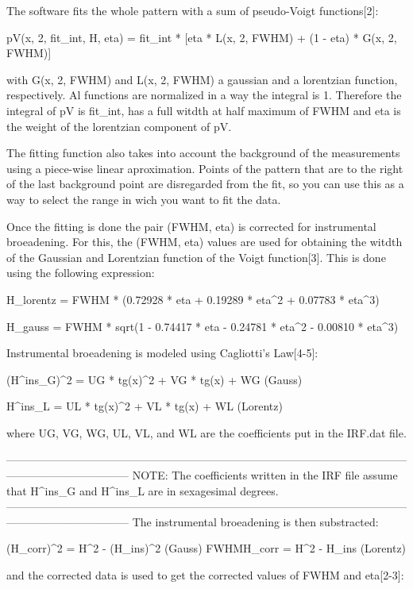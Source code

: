 The software fits the whole pattern with a sum of pseudo-Voigt functions[2]:

    pV(x, 2\theta, fit_int, H, eta) = fit_int * [eta * L(x, 2\theta, FWHM) + (1 - eta) * G(x, 2\theta, FWHM)]

with G(x, 2\theta, FWHM) and L(x, 2\theta, FWHM) a gaussian and a lorentzian function, respectively. Al functions are normalized in a way the integral is 1. 
Therefore the integral of pV is fit_int, has a full witdth at half maximum of FWHM and eta is the weight of the lorentzian component of pV.

The fitting function also takes into account the background of the measurements using a piece-wise linear aproximation. Points of the pattern that are to the
right of the last background point are disregarded from the fit, so you can use this as a way to select the range in wich you want to fit the data.

Once the fitting is done the pair (FWHM, eta) is corrected for instrumental broeadening. For this, the (FWHM, eta) values are used for obtaining the witdth of
the Gaussian and Lorentzian function of the Voigt function[3]. This is done using the following expression:

H_{lorentz} = FWHM * (0.72928 * eta + 0.19289 * eta^2 + 0.07783 * eta^3)

H_{gauss} = FWHM * sqrt(1 - 0.74417 * eta - 0.24781 * eta^2 - 0.00810 * eta^3)

Instrumental broeadening is modeled using Cagliotti's Law[4-5]:

(H^ins_G)^2 = UG * tg(x)^2 + VG * tg(x) + WG (Gauss)

H^ins_L = UL * tg(x)^2 + VL * tg(x) + WL (Lorentz)

where UG, VG, WG, UL, VL, and WL are the coefficients put in the IRF.dat file.

---------------------------------------------------------------------------------------------------------------------------------------------
NOTE: The coefficients written in the IRF file assume that H^ins_G and H^ins_L are in sexagesimal degrees.
---------------------------------------------------------------------------------------------------------------------------------------------
The instrumental broeadening is then substracted:

(H_corr)^2 = H^2 - (H_ins)^2 (Gauss)
FWHMH_corr = H^2 - H_ins (Lorentz)

and the corrected data is used to get the corrected values of FWHM and eta[2-3]:

